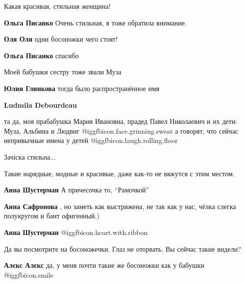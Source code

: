  
 
 
 
 

Какая красивая, стильная женщина!

\textbf{Ольга Писанко} Очень стильная, я тоже обратила внимание.

\textbf{Оля Оля} одни босоножки чего стоят!

\textbf{Ольга Писанко} спасибо

Моей бабушки сестру тоже звали Муза 

\textbf{Юлия Глинкова} тогда было распространённое имя

\textbf{Ludmila Debourdeau} 

та да, моя прабабушка Мария Ивановна, прадед Павел Николаевич и их дети: Муза,
Альбина и Людвиг  @igg{fbicon.face.grinning.sweat}  а говорят, что сейчас
непривычные имена у детей  @igg{fbicon.laugh.rolling.floor} 

Зачіска стильна...

Такие нарядные, модные и красивые, даже как-то не вяжутся с этим местом.

\textbf{Анна Шустерман} А причесочка то, \enquote{Рамочкой}

\textbf{Анна Сафронова} , но заметь как выстрижена, не так как у нас, чёлка слегка полукругом и бант офигенный.)

\textbf{Анна Шустерман}  @igg{fbicon.heart.with.ribbon} 

Да вы посмотрите на босоножечки. Глаз не оторвать. Вы сейчас такие видели?

\textbf{Алєкс Алєкс} да, у меня почти такие же босоножки как у бабушки  @igg{fbicon.smile} 
